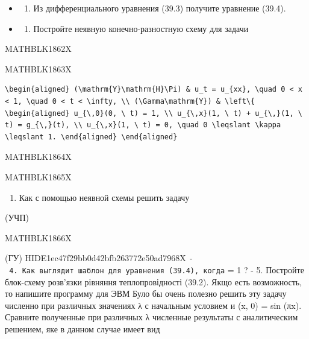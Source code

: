 \documentclass[
  ukrainian,
]{article}
\providecommand{\tightlist}{%
  \setlength{\itemsep}{0pt}\setlength{\parskip}{0pt}}
\begin{document}
\begin{itemize}
\tightlist
\item
  \begin{enumerate}
  \def\labelenumi{\arabic{enumi}.}
  \tightlist
  \item
    Из дифференциального уравнения (39.3) получите уравнение (39.4).
  \end{enumerate}
\item
  \begin{enumerate}
  \def\labelenumi{\arabic{enumi}.}
  \setcounter{enumi}{1}
  \tightlist
  \item
    Постройте неявную конечно-разностную схему для задачи
  \end{enumerate}
\end{itemize}

MATHBLK1862X

MATHBLK1863X

\begin{verbatim}
\begin{aligned} (\mathrm{Y}\mathrm{H}\Pi) & u_t = u_{xx}, \quad 0 < x < 1, \quad 0 < t < \infty, \\ (\Gamma\mathrm{Y}) & \left\{ \begin{aligned} u_{\,0}(0, \ t) = 1, \\ u_{\,x}(1, \ t) + u_{\,}(1, \ t) = g_{\,}(t), \\ u_{\,x}(1, \ t) = 0, \quad 0 \leqslant \kappa \leqslant 1. \end{aligned} \end{aligned}
\end{verbatim}

MATHBLK1864X

MATHBLK1865X

\begin{enumerate}
\def\labelenumi{\arabic{enumi}.}
\setcounter{enumi}{2}
\tightlist
\item
  Как с помощью неявной схемы решить задачу
\end{enumerate}

(УЧП)

MATHBLK1866X

(ГУ) HIDE1ec47f29bb0d42bfb263772e50ad7968X
\texttt{-\ 4.\ Как\ выглядит\ шаблон\ для\ уравнения\ (39.4),\ когда}
\lambda = 1 ? - 5. Постройте блок-схему розв'язки рівняння
теплопровідності (39.2). Якщо есть возможность, то напишите программу
для ЭВМ Було бы очень полезно решить эту задачу численно при различных
значениях λ с начальным условием и (x, 0) = sin (πx). Сравните
полученные при различных λ численные результаты с аналитическим
решением, яке в данном случае имеет вид
\end{document}

